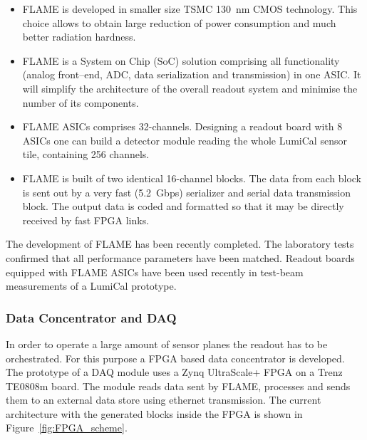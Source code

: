 \begin{itemize}
\item{FLAME is developed in smaller size TSMC 130~nm CMOS technology.
 This choice allows to obtain large reduction of power consumption and much better radiation hardness}.
\item{FLAME is a System on Chip (SoC) solution comprising all functionality
  (analog front--end, ADC, data serialization and transmission) in one ASIC.
  It will simplify the architecture of the overall readout system and minimise the number of its components.}
\item{FLAME ASICs comprises 32-channels. Designing a readout board with 8 ASICs one can build a detector module
  reading the whole LumiCal sensor tile, containing 256 channels.}
\item{FLAME is built of two identical 16-channel blocks. The data from each block is sent out
  by a very fast (\SI{5.2}{Gbps}) serializer and serial data transmission block. The output data is coded and formatted so that it may be directly received by fast FPGA links.}
\end{itemize}
The development of FLAME has been recently completed. The laboratory tests confirmed that all performance parameters have been matched. Readout boards equipped with FLAME ASICs have been used recently in test-beam measurements of a LumiCal prototype.  

\subsubsection{Data Concentrator and DAQ}

In order to operate a large amount of sensor planes the readout has to be orchestrated.
For this purpose a FPGA based data concentrator is developed.
The prototype of a DAQ module uses a Zynq UltraScale+ FPGA on a Trenz TE0808m board.
The module reads data sent by FLAME, processes and sends them to an external data store using ethernet transmission. 
The current architecture with the generated blocks inside the FPGA is shown in Figure~\ref{fig:FPGA_scheme}. 


